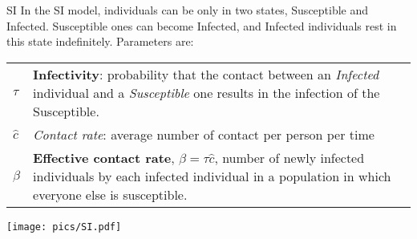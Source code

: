 \begin{textbox}{SI}
    In the SI model, individuals can be only in two states, Susceptible and Infected. Susceptible ones can become Infected, and Infected individuals rest in this state indefinitely. Parameters are:

    \begin{tabular}{p{}|p{}}\scriptsize

        $\tau$    & \textbf{Infectivity}: probability that the contact between an \textit{Infected} individual and a \textit{Susceptible} one results in the infection of the Susceptible.        \\
        $\hat{c}$ & \textit{Contact rate}: average number of contact per person per time                                                                                                          \\
        $\beta$   & \textbf{Effective contact rate}, $\beta=\tau\hat{c}$, number of newly infected individuals by each infected individual in a population in which everyone else is susceptible.
    \end{tabular}

    \centering
    \vspace{0.3cm}
    \texttt{[image: pics/SI.pdf]}
\end{textbox}


